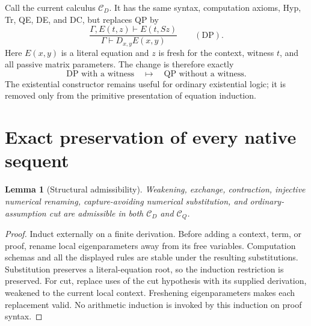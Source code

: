 \documentclass[11pt]{article}
\newtheorem{lemma}[theorem]{Lemma}
\theoremstyle{definition}
\newcommand{\CD}{\mathcal C_D}
\newcommand{\CQ}{\mathcal C_Q}
\begin{document}
Call the current calculus $\CD$. It has the same syntax, computation axioms,
Hyp, Tr, QE, DE, and DC, but replaces QP by
\begin{equation}
 \frac{\Gamma,E(t,z)\vdash E(t,Sz)}
      {\Gamma\vdash D_{x,y}E(x,y)}
 \qquad (\mathrm{DP}).\label{eq:dp}
\end{equation}
Here $E(x,y)$ is a literal equation and $z$ is fresh for the context, witness
$t$, and all passive matrix parameters. The change is therefore exactly
\[
     \text{DP with a witness}\quad\longmapsto\quad
     \text{QP without a witness}.
\]
The existential constructor remains useful for ordinary existential logic;
it is removed only from the primitive presentation of equation induction.

\section{Exact preservation of every native sequent}
\label{sec:equivalence}

\begin{lemma}[Structural admissibility]
Weakening, exchange, contraction, injective numerical renaming,
capture-avoiding numerical substitution, and ordinary-assumption cut are
admissible in both $\CD$ and $\CQ$.
\end{lemma}
\begin{proof}
Induct externally on a finite derivation. Before adding a context, term, or
proof, rename local eigenparameters away from its free variables. Computation
schemas and all the displayed rules are stable under the resulting
substitutions. Substitution preserves a literal-equation root, so the
induction restriction is preserved. For cut, replace uses of the cut
hypothesis with its supplied derivation, weakened to the current local
context. Freshening eigenparameters makes each replacement valid. No
arithmetic induction is invoked by this induction on proof syntax.
\end{proof}
\end{document}
